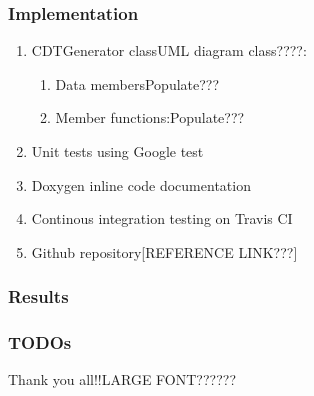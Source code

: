 \documentclass{beamer}
\begin{document}
	\begin{frame}
		\frametitle{Implementation}
			\begin{enumerate}
				\item CDTGenerator class{UML diagram class????}:
					\begin{enumerate}
						\item Data members{Populate???}
						\item Member functions:{Populate???}	
					\end{enumerate}		
				\item Unit tests using Google test
				\item Doxygen inline code documentation
				\item Continous integration testing on Travis CI	
				\item Github repository[REFERENCE LINK???]	
			\end{enumerate}
	\end{frame}	
	\begin{frame}
		\frametitle{Results} 	
	\end{frame}	
	\begin{frame}
		\frametitle{TODOs}	
	\end{frame}	
	\begin{frame}
		Thank you all!!{LARGE FONT??????}
	\end{frame}	
\end{document}
